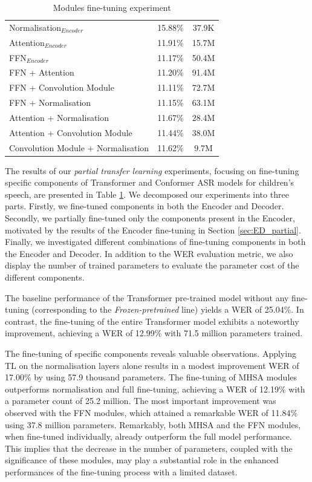 \begin{table}
\begin{center}
\begin{tabular}{lcc}
            Normalisation$_{Encoder}$ & 15.88\% & 37.9K \\ 
            Attention$_{Encoder}$ & 11.91\% & 15.7M \\ 
            FFN$_{Encoder}$ & 11.17\% & 50.4M \\ \hline
            FFN + Attention & 11.20\% & 91.4M \\
            FFN + Convolution Module & 11.11\% & 72.7M \\
            FFN + Normalisation & 11.15\% & 63.1M \\
            Attention + Normalisation & 11.67\% & 28.4M \\
            Attention + Convolution Module & 11.44\% & 38.0M \\
            Convolution Module + Normalisation & 11.62\% & 9.7M\\ \hline
        \end{tabular}
    \end{center}
    \caption{Modules fine-tuning experiment}
    \label{table:ModulesTL}
\end{table}
The results of our \textit{partial transfer learning} experiments, focusing on fine-tuning specific components of Transformer and Conformer \ac{ASR} models for children's speech, are presented in Table \ref{table:ModulesTL}. We decomposed our experiments into three parts. Firstly, we fine-tuned components in both the Encoder and Decoder. Secondly, we partially fine-tuned only the components present in the Encoder, motivated by the results of the Encoder fine-tuning in Section \ref{sec:ED_partial}. Finally, we investigated different combinations of fine-tuning components in both the Encoder and Decoder. In addition to the \ac{WER} evaluation metric, we also display the number of trained parameters to evaluate the parameter cost of the different components. 

The baseline performance of the Transformer pre-trained model without any fine-tuning (corresponding to the \textit{Frozen-pretrained} line) yields a \ac{WER} of 25.04\%. In contrast, the fine-tuning of the entire Transformer model exhibits a noteworthy improvement, achieving a \ac{WER} of 12.99\% with 71.5 million parameters trained.

The fine-tuning of specific components reveals valuable observations. Applying \ac{TL} on the normalisation layers alone results in a modest improvement \ac{WER} of 17.00\% by using 57.9 thousand parameters. The fine-tuning of \ac{MHSA} modules outperforms normalisation and full fine-tuning, achieving a \ac{WER} of 12.19\% with a parameter count of 25.2 million. The most important improvement was observed with the \ac{FFN} modules, which attained a remarkable \ac{WER} of 11.84\% using 37.8 million parameters. Remarkably, both \ac{MHSA} and the \ac{FFN} modules, when fine-tuned individually, already outperform the full model performance. This implies that the decrease in the number of parameters, coupled with the significance of these modules, may play a substantial role in the enhanced performances of the fine-tuning process with a limited dataset.

